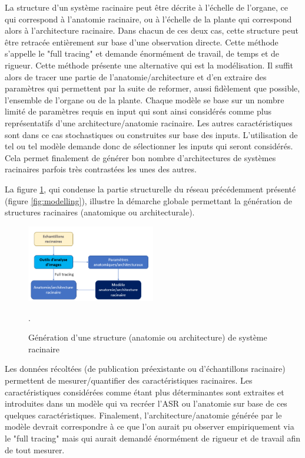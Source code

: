 La structure d'un système racinaire peut être décrite à l'échelle de l'organe, ce qui correspond à l'anatomie racinaire, ou à l'échelle de la plante qui correspond alors à l'architecture racinaire.
Dans chacun de ces deux cas, cette structure peut être retracée entièrement sur base d'une observation directe.
Cette méthode s'appelle le "full tracing" et demande énormément de travail, de temps et de rigueur.
Cette méthode présente une alternative qui est la modélisation.
Il suffit alors de tracer une partie de l'anatomie/architecture et d'en extraire des paramètres qui permettent par la suite de reformer, aussi fidèlement que possible, l'ensemble de l'organe ou de la plante.
Chaque modèle se base sur un nombre limité de paramètres requis en input qui sont ainsi considérés comme plus représentatifs d'une architecture/anatomie racinaire.
Les autres caractéristiques sont dans ce cas stochastiques ou construites sur base des inputs.
L'utilisation de tel ou tel modèle demande donc de sélectionner les inputs qui seront considérés.
Cela permet finalement de générer bon nombre d'architectures de systèmes racinaires parfois très contrastées les unes des autres.
\newline

La figure \ref{fig:structure generation}, qui condense la partie structurelle du réseau précédemment présenté (figure \ref{fig:modelling}), illustre la démarche globale permettant la génération de structures racinaires (anatomique ou architecturale).

\begin{figure}[ht]
\centering
\includegraphics[width=0.5\textwidth]{Image/structure generation.png}
\caption{Génération d'une structure (anatomie ou architecture) de système racinaire}.
\label{fig:structure generation}
\end{figure}

Les données récoltées (de publication préexistante ou d'échantillons racinaire) permettent de mesurer/quantifier des caractéristiques racinaires.
Les caractéristiques considérées comme étant plus déterminantes sont extraites et introduites dans un modèle qui va recréer l'ASR ou l'anatomie sur base de ces quelques caractéristiques.
Finalement, l'architecture/anatomie générée par le modèle devrait correspondre à ce que l'on aurait pu observer empiriquement via le "full tracing" mais qui aurait demandé énormément de rigueur et de travail afin de tout mesurer.


